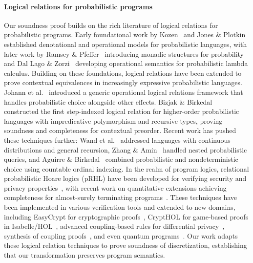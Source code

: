 \paragraph{Logical relations for probabilistic programs}
Our soundness proof builds on the rich literature of logical relations for probabilistic programs.
Early foundational work by Kozen~\cite{Kozen1981Semantics} and Jones \& Plotkin~\cite{Jones1989Probabilistic} established denotational and operational models for probabilistic languages, with later work by Ramsey \& Pfeffer~\cite{Ramsey2002Stochastic} introducing monadic structures for probability and Dal Lago \& Zorzi~\cite{DiLago2012Probabilistic} developing operational semantics for probabilistic lambda calculus.
Building on these foundations, logical relations have been extended to prove contextual equivalences in increasingly expressive probabilistic languages.
Johann et al.~\cite{Johann2010Generic} introduced a generic operational logical relations framework that handles probabilistic choice alongside other effects.
Bizjak \& Birkedal~\cite{Bizjak2015Step} constructed the first step-indexed logical relation for higher-order probabilistic languages with impredicative polymorphism and recursive types, proving soundness and completeness for contextual preorder.
Recent work has pushed these techniques further: Wand et al.~\cite{Wand2018Contextual} addressed languages with continuous distributions and general recursion, Zhang \& Amin~\cite{Zhang2022Reasoning} handled nested probabilistic queries, and Aguirre \& Birkedal~\cite{Aguirre2023Step} combined probabilistic and nondeterministic choice using countable ordinal indexing.
In the realm of program logics, relational probabilistic Hoare logics (pRHL) have been developed for verifying security and privacy properties~\cite{Barthe2009Formal,Barthe2012Privacy}, with recent work on quantitative extensions achieving completeness for almost-surely terminating programs~\cite{Avanzini2025Quantitative}.
These techniques have been implemented in various verification tools and extended to new domains, including EasyCrypt for cryptographic proofs~\cite{Barthe2011Computer}, CryptHOL for game-based proofs in Isabelle/HOL~\cite{Basin2020CryptHOL}, advanced coupling-based rules for differential privacy~\cite{Barthe2016Proving,Barthe2016Advanced}, synthesis of coupling proofs~\cite{Albarghouthi2018Synthesizing}, and even quantum programs~\cite{Barthe2020Quantum}.
Our work adapts these logical relation techniques to prove soundness of discretization, establishing that our transformation preserves program semantics.

